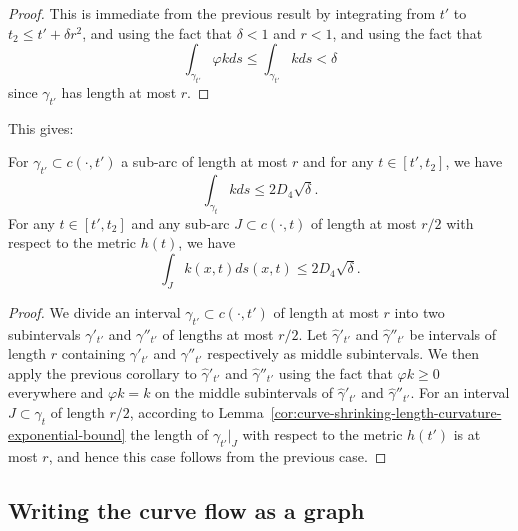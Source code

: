 \begin{proof}
This is immediate from the previous result by integrating from $t'$
to $t_2\le t'+\delta r^2$, and using the fact that $\delta<1$ and
$r<1$, and using the fact that $$\int_{\gamma_{t'}}\varphi kds\le
\int_{\gamma_{t'}}kds<\delta$$ since $\gamma_{t'}$ has length at
most $r$.
\end{proof}

This gives:

\begin{corollary}
\label{cor:curvature-integral-uniform-bound}
\label{D_4cor}
For $\gamma_{t'}\subset c(\cdot,t')$ a sub-arc of length at most $r$
 and for any $t\in [t',t_2]$, we have
$$\int_{\gamma_t}kds\le
2D_4\sqrt{\delta}.$$ For any $t\in [t',t_2]$ and any sub-arc
$J\subset c(\cdot,t)$ of length at most $r/2$ with respect to the
metric $h(t)$, we have
$$\int_Jk(x,t)ds(x,t)\le 2D_4\sqrt{\delta}.$$
\end{corollary}

\begin{proof}
We divide an  interval $\gamma_{t'}\subset c(\cdot,t')$ of length at
most $r$ into two subintervals $\gamma'_{t'}$ and $\gamma''_{t'}$ of
lengths at most $r/2$. Let $\hat \gamma'_{t'}$ and $\hat
\gamma''_{t'}$ be intervals of length $r$ containing $\gamma'_{t'}$
and $\gamma''_{t'}$ respectively as  middle subintervals. We then
apply the previous corollary to  $\hat \gamma'_{t'}$ and $\hat
\gamma''_{t'}$ using the fact that $\varphi k\ge 0$ everywhere and
$\varphi k=k$ on the middle subintervals of $\hat \gamma'_{t'}$ and
$\hat \gamma ''_{t'}$. For an interval $J\subset \gamma_t$ of length
$r/2$, according to Lemma~\ref{cor:curve-shrinking-length-curvature-exponential-bound} the length of
$\gamma_{t'}|_J$ with respect to the metric $h(t')$ is at most $r$,
and hence this case follows from the previous case.
\end{proof}


\subsection{Writing the curve flow as a graph}

